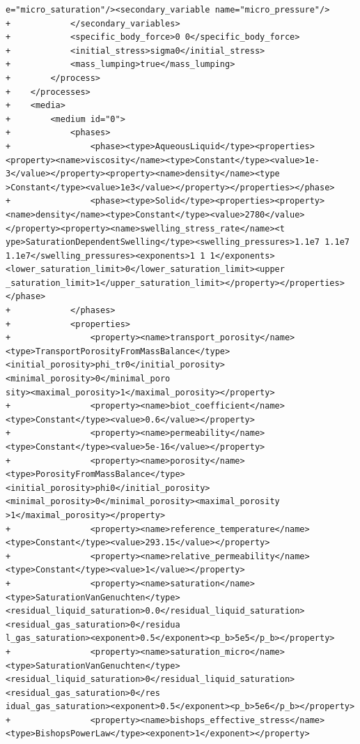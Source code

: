 \documentclass[10pt]{article}
\begin{document}
\begin{lstlisting}
e="micro_saturation"/><secondary_variable name="micro_pressure"/>
+            </secondary_variables>
+            <specific_body_force>0 0</specific_body_force>
+            <initial_stress>sigma0</initial_stress>
+            <mass_lumping>true</mass_lumping>
+        </process>
+    </processes>
+    <media>
+        <medium id="0">
+            <phases>
+                <phase><type>AqueousLiquid</type><properties><property><name>viscosity</name><type>Constant</type><value>1e-3</value></property><property><name>density</name><type
>Constant</type><value>1e3</value></property></properties></phase>
+                <phase><type>Solid</type><properties><property><name>density</name><type>Constant</type><value>2780</value></property><property><name>swelling_stress_rate</name><t
ype>SaturationDependentSwelling</type><swelling_pressures>1.1e7 1.1e7 1.1e7</swelling_pressures><exponents>1 1 1</exponents><lower_saturation_limit>0</lower_saturation_limit><upper
_saturation_limit>1</upper_saturation_limit></property></properties></phase>
+            </phases>
+            <properties>
+                <property><name>transport_porosity</name><type>TransportPorosityFromMassBalance</type><initial_porosity>phi_tr0</initial_porosity><minimal_porosity>0</minimal_poro
sity><maximal_porosity>1</maximal_porosity></property>
+                <property><name>biot_coefficient</name><type>Constant</type><value>0.6</value></property>
+                <property><name>permeability</name><type>Constant</type><value>5e-16</value></property>
+                <property><name>porosity</name><type>PorosityFromMassBalance</type><initial_porosity>phi0</initial_porosity><minimal_porosity>0</minimal_porosity><maximal_porosity
>1</maximal_porosity></property>
+                <property><name>reference_temperature</name><type>Constant</type><value>293.15</value></property>
+                <property><name>relative_permeability</name><type>Constant</type><value>1</value></property>
+                <property><name>saturation</name><type>SaturationVanGenuchten</type><residual_liquid_saturation>0.0</residual_liquid_saturation><residual_gas_saturation>0</residua
l_gas_saturation><exponent>0.5</exponent><p_b>5e5</p_b></property>
+                <property><name>saturation_micro</name><type>SaturationVanGenuchten</type><residual_liquid_saturation>0</residual_liquid_saturation><residual_gas_saturation>0</res
idual_gas_saturation><exponent>0.5</exponent><p_b>5e6</p_b></property>
+                <property><name>bishops_effective_stress</name><type>BishopsPowerLaw</type><exponent>1</exponent></property>

\end{lstlisting}
\end{document}
